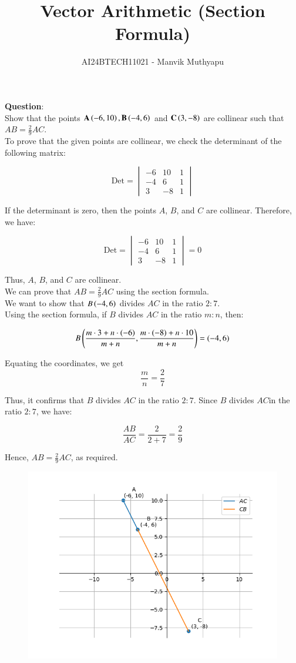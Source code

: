 \documentclass[journal,12pt,onecolumn]{IEEEtran}
\title{Vector Arithmetic (Section Formula)}
\author{AI24BTECH11021 - Manvik Muthyapu}
\theoremstyle{remark}
\begin{document}


\maketitle
\bigskip

\renewcommand{\thefigure}{\theenumi}
\renewcommand{\thetable}{\theenumi}

\textbf{Question}:\\
Show that the points $\textbf{A}\left(-6,10\right),\textbf{B}\left(-4,6\right)$ and $\textbf{C}\left(3,-8\right)$ are collinear such that $AB = \frac{2}{9}AC$.\\
		
\solution 
To prove that the given points are collinear, we check the determinant of the following matrix:

$$
\text{Det} = 
\begin{vmatrix}
-6 & 10 & 1 \\
-4 & 6 & 1 \\
3 & -8 & 1
\end{vmatrix}
$$

If the determinant is zero, then the points $A$, $B$, and $C$ are collinear. Therefore, we have:

$$
\text{Det} = 
\begin{vmatrix}
-6 & 10 & 1 \\
-4 & 6 & 1 \\
3 & -8 & 1
\end{vmatrix}
= 0$$

Thus, $A$, $B$, and $C$ are collinear.\\

We can prove that $AB = \frac{2}{9} AC$ using the section formula.\\

We want to show that $B\left(-4, 6\right)$ divides $AC$ in the ratio $2:7$.\\

Using the section formula, if $B$ divides $AC$ in the ratio $m:n$, then:

$$B\left(\frac{m \cdot 3 + n \cdot (-6)}{m+n}, \frac{m \cdot (-8) + n \cdot 10}{m+n}\right) = (-4, 6)$$

Equating the coordinates, we get 
$$\frac{m}{n} = \frac{2}{7}$$


Thus, it confirms that $B$ divides $AC$ in the ratio $2:7$.
Since $B$ divides $AC$in the ratio $2:7$, we have:


$$\frac{AB}{AC} = \frac{2}{2+7} = \frac{2}{9}$$

Hence, $AB = \frac{2}{9} AC$, as required.

\begin{figure}[h!]
	\centering
	\includegraphics[width=0.7\linewidth]{figs/fig1.png}
\end{figure}
\end{document}
